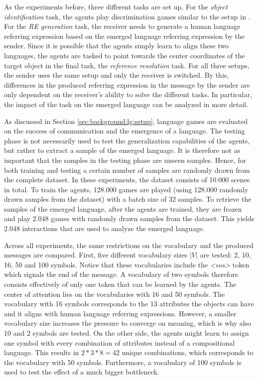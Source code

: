 As the experiments before, three different tasks are set up.
For the \emph{object identification} task, the agents play discrimination games similar to the setup in \citep{Lazaridou2017}.
For the \emph{RE generation} task, the receiver needs to generate a human language referring expression based on the emerged language referring expression by the sender.
Since it is possible that the agents simply learn to align these two languages, the agents are tasked to point towards the center coordinates of the target object in the final task, the \emph{reference resolution} task.
For all three setups, the sender uses the same setup and only the receiver is switched.
By this, differences in the produced referring expression in the message by the sender are only dependent on the receiver's ability to solve the different tasks.
In particular, the impact of the task on the emerged language can be analyzed in more detail.

As discussed in Section \ref{sec:background:lg:setup}, language games are evaluated on the success of communication and the emergence of a language.
The testing phase is not necessarily used to test the generalization capabilities of the agents, but rather to extract a sample of the emerged language.
It is therefore not as important that the samples in the testing phase are unseen samples.
Hence, for both training and testing a certain number of samples are randomly drawn from the complete dataset.
In these experiments, the dataset consists of 10.000 scenes in total.
To train the agents, 128.000 games are played (using 128.000 randomly drawn samples from the dataset) with a batch size of 32 samples.
To retrieve the samples of the emerged language, after the agents are trained, they are frozen and play 2.048 games with randomly drawn samples from the dataset.
This yields 2.048 interactions that are used to analyze the emerged language.

Across all experiments, the same restrictions on the vocabulary and the produced messages are compared.
First, five different vocabulary sizes $|V|$ are tested: 2, 10, 16, 50 and 100 symbols.
Notice that these vocabularies include the \emph{<eos>} token which signals the end of the message.
A vocabulary of two symbols therefore consists effectively of only one token that can be learned by the agents.
The center of attention lies on the vocabularies with 16 and 50 symbols.
The vocabulary with 16 symbols corresponds to the 13 attributes the objects can have and it aligns with human language referring expressions.
However, a smaller vocabulary size increases the pressure to converge on meaning, which is why also 10 and 2 symbols are tested.
On the other side, the agents might learn to assign one symbol with every combination of attributes instead of a compositional language.
This results in $2 * 3 * 8 = 42$ unique combinations, which corresponds to the vocabulary with 50 symbols.
Furthermore, a vocabulary of 100 symbols is used to test the effect of a much bigger bottleneck.

